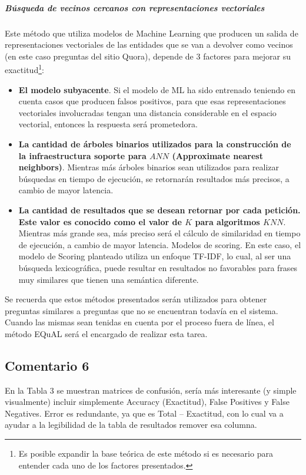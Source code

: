 \subparagraph{Búsqueda de vecinos cercanos con representaciones vectoriales}
Este método que utiliza modelos de Machine Learning que producen un salida de representaciones vectoriales de las entidades que se van a devolver como vecinos (en este caso preguntas del sitio Quora), depende de 3 factores para mejorar su exactitud\footnote{Es posible expandir la base teórica de este método si es necesario para entender cada uno de los factores presentados.}:
\begin{itemize}
	\item \textbf{El modelo subyacente}. Si el modelo de ML ha sido entrenado teniendo en cuenta casos que producen falsos positivos, para que esas representaciones vectoriales involucradas tengan una distancia considerable en el espacio vectorial, entonces la respuesta será prometedora.
	\item \textbf{La cantidad de árboles binarios utilizados para la construcción de la infraestructura soporte para \(ANN\) (Approximate nearest neighbors)}. Mientras más árboles binarios sean utilizados para realizar búsquedas en tiempo de ejecución, se retornarán resultados más precisos, a cambio de mayor latencia.
	\item \textbf{La cantidad de resultados que se desean retornar por cada petición. Este valor es conocido como el valor de \(K\) para algoritmos \(KNN\)}. Mientras más grande sea, más preciso será el cálculo de similaridad en tiempo de ejecución, a cambio de mayor latencia.
	Modelos de scoring. En este caso, el modelo de Scoring planteado utiliza un enfoque TF-IDF, lo cual, al ser una búsqueda lexicográfica, puede resultar en resultados no favorables para frases muy similares que tienen una semántica diferente.
\end{itemize}

Se recuerda que estos métodos presentados serán utilizados para obtener preguntas similares a preguntas que no se encuentran todavía en el sistema. Cuando las mismas sean tenidas en cuenta por el proceso fuera de línea, el método EQuAL será el encargado de realizar esta tarea.


\subsection*{Comentario 6}
En la Tabla 3 se muestran matrices de confusión, sería más interesante (y simple visualmente) incluir simplemente Accuracy (Exactitud), False Positives y False Negatives. Error es redundante, ya que es Total – Exactitud, con lo cual va a ayudar a la legibilidad de la tabla de resultados remover esa columna.

